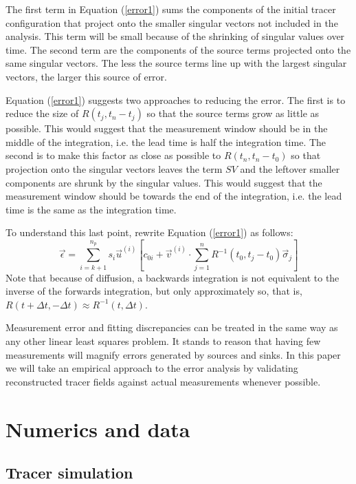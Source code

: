 \documentclass{article}
\begin{document}
The first term in Equation (\ref{error1}) sums the components of the initial tracer configuration that project onto the smaller singular vectors not included in the analysis. 
This term will be small because of the shrinking of singular values over time.
The second term are the components of the source terms projected onto the same singular vectors.
The less the source terms line up with the largest singular vectors, the
larger this source of error.

Equation (\ref{error1}) suggests two approaches to reducing the error.
The first is to reduce the size of $R(t_j, t_n-t_j)$ so that the source terms
grow as little as possible.
This would suggest that the measurement window should be in the middle
of the integration, i.e. the lead time is half the integration time.
The second is to make this factor as close as possible to $R(t_n, t_n-t_0)$
so that projection onto the singular vectors leaves the term $SV$ and
the leftover smaller components are shrunk by the singular values.
This would suggest that the measurement window should be towards the end
of the integration, i.e. the lead time is the same as the integration time.

To understand this last point, rewrite Equation (\ref{error1}) as follows:
\begin{equation}
	\vec \epsilon = \sum_{i=k+1}^{n_p} s_i \vec u^{(i)} \left [c_{0i}
	+ \vec v^{(i)} \cdot \sum_{j=1}^n R^{-1}(t_0, t_j-t_0) \vec \sigma_j \right ]
\end{equation}
Note that because of diffusion, 
a backwards integration is not equivalent to the inverse of the
forwards integration, but only approximately so, that is,
$R(t+\Delta t, -\Delta t) \approx R^{-1}(t, \Delta t)$.

Measurement error and fitting discrepancies can be treated in the same way 
as any other linear least squares problem. 
It stands to reason that having few measurements will magnify 
errors generated by sources and sinks.
In this paper we will take an empirical approach to the error analysis by
validating reconstructed tracer fields against actual measurements whenever
possible.


\section{Numerics and data}

\subsection{Tracer simulation}
\end{document}
